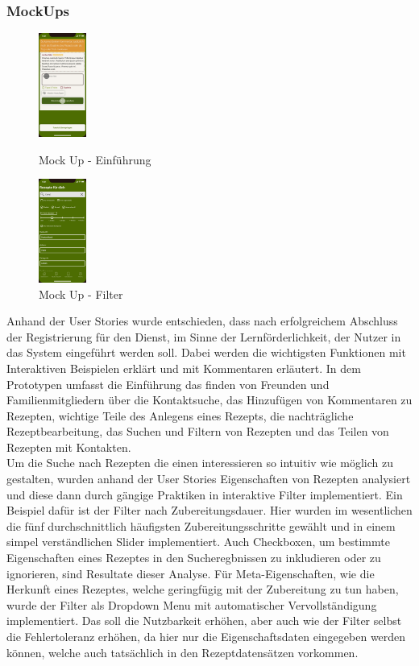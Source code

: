 \subsubsection{MockUps}
\begin{figure}
    \centering
        \includegraphics[width=0.14\textwidth]{images/introduction.jpg}
    \caption[Mock Up - Einführung]{Mock Up - Einführung}
\label{fig:mockup-introduction}
    \center
        \includegraphics[width=0.14\textwidth]{images/filter.jpg}
    \caption[Mock Up - Filter]{Mock Up - Filter}
\label{fig:mockup-filter}
\end{figure}
Anhand der User Stories wurde entschieden, dass nach erfolgreichem Abschluss der Registrierung für den Dienst, im Sinne der Lernförderlichkeit, der Nutzer in das System eingeführt werden soll. Dabei werden die wichtigsten Funktionen mit Interaktiven Beispielen erklärt und mit Kommentaren erläutert. In dem Prototypen umfasst die Einführung das finden von Freunden und Familienmitgliedern über die Kontaktsuche, das Hinzufügen von Kommentaren zu Rezepten, wichtige Teile des Anlegens eines Rezepts, die nachträgliche Rezeptbearbeitung, das Suchen und Filtern von Rezepten und das Teilen von Rezepten mit Kontakten. \\
Um die Suche nach Rezepten die einen interessieren so intuitiv wie möglich zu gestalten, wurden anhand der User Stories Eigenschaften von Rezepten analysiert und diese dann durch gängige Praktiken in interaktive Filter implementiert. Ein Beispiel dafür ist der Filter nach Zubereitungsdauer. Hier wurden im wesentlichen die fünf durchschnittlich häufigsten Zubereitungsschritte gewählt und in einem simpel verständlichen Slider implementiert. Auch Checkboxen, um bestimmte Eigenschaften eines Rezeptes in den Sucheregbnissen zu inkludieren oder zu ignorieren, sind Resultate dieser Analyse. Für Meta-Eigenschaften, wie die Herkunft eines Rezeptes, welche geringfügig mit der Zubereitung zu tun haben, wurde der Filter als Dropdown Menu mit automatischer Vervollständigung implementiert. Das soll die Nutzbarkeit erhöhen, aber auch wie der Filter selbst die Fehlertoleranz erhöhen, da hier nur die Eigenschaftsdaten eingegeben werden können, welche auch tatsächlich in den Rezeptdatensätzen vorkommen. \\

